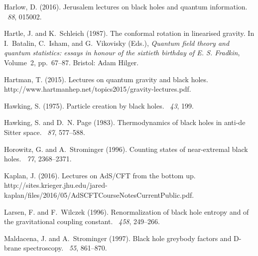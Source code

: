 \documentclass{article}
\begin{document}
\begin{thebibliography}{}
Harlow, D. (2016).
\newblock Jerusalem lectures on black holes and quantum information.
~{\em 88}, 015002.

Hartle, J. and K.~Schleich (1987).
\newblock The conformal rotation in linearised gravity.
\newblock In I.~Batalin, C.~Isham, and G.~Vikovisky (Eds.), {\em Quantum field
  theory and quantum statistics: essays in honour of the sixtieth birthday of
  {E}. {S}. {F}radkin}, Volume~2, pp.\  67--87. Bristol: Adam Hilger.

Hartman, T. (2015).
\newblock Lectures on quantum gravity and black holes.
\newblock http://www.hartmanhep.net/topics2015/gravity-lectures.pdf.

Hawking, S. (1975).
\newblock Particle creation by black holes.
~{\em 43}, 199.

Hawking, S. and D.~N. Page (1983).
\newblock Thermodynamics of black holes in anti-de {S}itter space.
~{\em 87}, 577--588.

Horowitz, G. and A.~Strominger (1996).
\newblock Counting states of near-extremal black holes.
~{\em 77}, 2368--2371.

Kaplan, J. (2016).
\newblock Lectures on {A}d{S}/{CFT} from the bottom up.
\newblock
  http://sites.krieger.jhu.edu/jared-kaplan/files/2016/05/AdSCFTCourseNotesCurrentPublic.pdf.

Larsen, F. and F.~Wilczek (1996).
\newblock Renormalization of black hole entropy and of the gravitational
  coupling constant.
~{\em 458}, 249--266.

Maldacena, J. and A.~Strominger (1997).
\newblock Black hole greybody factors and {D}-brane spectroscopy.
~{\em 55}, 861--870.


\end{thebibliography}
\end{document}
